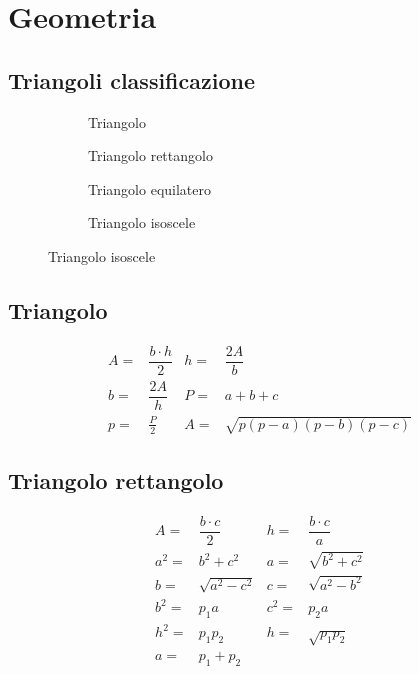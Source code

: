 \chapter{Geometria}
\section{Triangoli classificazione}
{\centering{}
\centering}

{\centering{}
\centering }

\begin{figure}
\begin{subfigure}[b]{.5\linewidth}

\caption{Triangolo}\label{sub:triangolo}
\end{subfigure}
\begin{subfigure}[b]{.5\linewidth}
	
	\caption{Triangolo rettangolo}\label{sub:triangolorettangolo}
\end{subfigure}
\begin{subfigure}[b]{.5\linewidth}
	
	\caption{Triangolo equilatero}\label{sub:triangoloequilatero}
\end{subfigure}
\begin{subfigure}[b]{.5\linewidth}

	\caption{Triangolo isoscele}\label{sub:triangoloisoscele}
\end{subfigure}
\label{fig:trianoli}
\end{figure}
\section{Triangolo}
	\begin{align*}
A=&\dfrac{b\cdot h}{2}&h=&\dfrac{2A}{b}\\
b=&\dfrac{2A}{h}&P=&a+b+c\\
p=&\frac{P}{2}&	A=&\sqrt{p(p-a)(p-b)(p-c)}
\end{align*}

\section{Triangolo rettangolo}
	\begin{align*}
A=&\dfrac{b\cdot c}{2}&h=&\dfrac{b\cdot c}{a}\\
a^2=&b^2+c^2&a=&\sqrt{b^2+c^2}\\
b=&\sqrt{a^2-c^2}&c=&\sqrt{a^2-b^2}\\
b^2=&p_1a&c^2=&p_2a\\
h^2=&p_1p_2&h=&\sqrt{p_1p_2}\\
a=&p_1+p_2
\end{align*}
